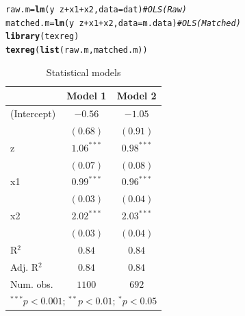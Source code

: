 \documentclass[onesided]{article}\usepackage[]{graphicx}\usepackage[]{color}
\makeatletter
\newcommand{\hlcom}[1]{\textcolor[rgb]{0.678,0.584,0.686}{\textit{#1}}}%
\newcommand{\hlopt}[1]{\textcolor[rgb]{0,0,0}{#1}}%
\newcommand{\hlstd}[1]{\textcolor[rgb]{0.345,0.345,0.345}{#1}}%
\newcommand{\hlkwb}[1]{\textcolor[rgb]{0.69,0.353,0.396}{#1}}%
\newcommand{\hlkwc}[1]{\textcolor[rgb]{0.333,0.667,0.333}{#1}}%
\newcommand{\hlkwd}[1]{\textcolor[rgb]{0.737,0.353,0.396}{\textbf{#1}}}%
\newenvironment{kframe}{%
 \def\at@end@of@kframe{}%
 \ifinner\ifhmode%
  \def\at@end@of@kframe{\end{minipage}}%
  \begin{minipage}{\columnwidth}%
 \fi\fi%
 \def\FrameCommand##1{\hskip\@totalleftmargin \hskip-\fboxsep
 \colorbox{shadecolor}{##1}\hskip-\fboxsep
     \hskip-\linewidth \hskip-\@totalleftmargin \hskip\columnwidth}%
 \MakeFramed {\advance\hsize-\width
   \@totalleftmargin\z@ \linewidth\hsize
   \@setminipage}}%
 {\par\unskip\endMakeFramed%
 \at@end@of@kframe}
\makeatother
\begin{document}
\begin{kframe}
\begin{alltt}
\hlstd{raw.m} \hlkwb{=} \hlkwd{lm}\hlstd{(y} \hlopt{~} \hlstd{z} \hlopt{+} \hlstd{x1} \hlopt{+} \hlstd{x2,} \hlkwc{data} \hlstd{= dat)} \hlcom{# OLS (Raw)}
\hlstd{matched.m} \hlkwb{=} \hlkwd{lm}\hlstd{(y} \hlopt{~} \hlstd{z} \hlopt{+} \hlstd{x1} \hlopt{+} \hlstd{x2,} \hlkwc{data} \hlstd{= m.data)} \hlcom{# OLS (Matched)}
\hlkwd{library}\hlstd{(texreg)}
\hlkwd{texreg}\hlstd{(}\hlkwd{list}\hlstd{(raw.m, matched.m))}
\end{alltt}
\end{kframe}
\begin{table}
\begin{center}
\begin{tabular}{l c c}
\hline
 & Model 1 & Model 2 \\
\hline
(Intercept) & $-0.56$      & $-1.05$      \\
            & $(0.68)$     & $(0.91)$     \\
z           & $1.06^{***}$ & $0.98^{***}$ \\
            & $(0.07)$     & $(0.08)$     \\
x1          & $0.99^{***}$ & $0.96^{***}$ \\
            & $(0.03)$     & $(0.04)$     \\
x2          & $2.02^{***}$ & $2.03^{***}$ \\
            & $(0.03)$     & $(0.04)$     \\
\hline
R$^2$       & $0.84$       & $0.84$       \\
Adj. R$^2$  & $0.84$       & $0.84$       \\
Num. obs.   & $1100$       & $692$        \\
\hline
\multicolumn{3}{l}{\scriptsize{$^{***}p<0.001$; $^{**}p<0.01$; $^{*}p<0.05$}}
\end{tabular}
\caption{Statistical models}
\label{table:coefficients}
\end{center}
\end{table}
\end{document}
